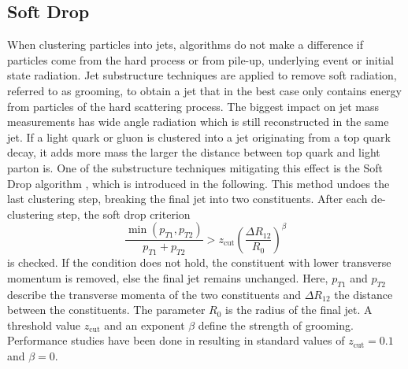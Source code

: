 \subsection{Soft Drop}
\label{sec:sd}
	When clustering particles into jets, algorithms do not make a difference if particles come from the hard process or from pile-up, underlying event or initial state radiation. Jet substructure techniques are applied to remove soft radiation, referred to as grooming, to obtain a jet that in the best case only contains energy from particles of the hard scattering process. The biggest impact on jet mass measurements has wide angle radiation which is still reconstructed in the same jet. If a light quark or gluon is clustered into a jet originating from a top quark decay, it adds more mass the larger the distance between top quark and light parton is. One of the substructure techniques mitigating this effect is the Soft Drop algorithm \cite{softdrop}, which is introduced in the following. This method undoes the last clustering step, breaking the final jet into two constituents. After each de-clustering step, the soft drop criterion
	\begin{equation}
	\frac{\min(p_{T1}, p_{T2})}{p_{T1} + p_{T2}} > z_\text{cut} \left( \frac{\Delta R_{12}}{R_0}\right)^\beta
	\label{eq:sd}
	\end{equation}
	is checked. If the condition does not hold, the constituent with lower transverse momentum is removed, else the final jet remains unchanged. Here, $p_{T1}$ and $p_{T2}$ describe the transverse momenta of the two constituents and $\Delta R_{12}$ the distance between the constituents. The parameter $R_0$ is the radius of the final jet. A threshold value $z_\text{cut}$ and an exponent $\beta$ define the strength of grooming. Performance studies have been done in \cite{softdropvalues} resulting in standard values of $z_\text{cut} = 0.1$ and $\beta =0$.	
		
